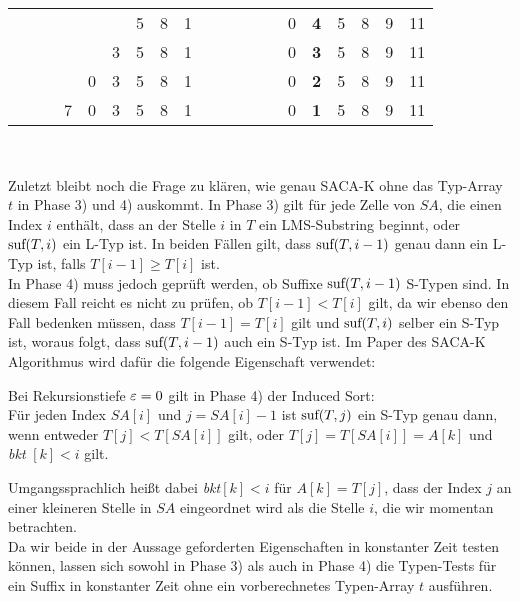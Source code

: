\begin{center}
\begin{tabular}{| r || c | c c c c c | c c | c | c | c c |   c   |c c c c c c| }
	\cline{1-13}
    \cline{15-20}
& & & & & & 5 & 8 & 1 & & & &         & & 0 & \textbf 4 & 5 & 8 & 9 & 11 \\
	\cline{1-13}
    \cline{15-20}
& & & & & 3 & 5 & 8 & 1 & & & &          & & 0 & \textbf 3 & 5 & 8 & 9 & 11 \\
	\cline{1-13}
    \cline{15-20}
& & & & 0 & 3 & 5 & 8 & 1 & & & &         & & 0 & \textbf 2 & 5 & 8 & 9 & 11 \\
	\cline{1-13}
    \cline{15-20}
& & & 7 & 0 & 3 & 5 & 8 & 1 & & & &        & & 0 & \textbf 1 & 5 & 8 & 9 & 11 \\
	\cline{1-13}
    \cline{15-20}
\end{tabular} \\
\end{center}

Zuletzt bleibt noch die Frage zu klären, wie genau SACA-K ohne das Typ-Array $t$ in Phase 3) und 4) auskommt. In Phase 3) gilt für jede Zelle von $SA$, die einen Index $i$ enthält, dass an der Stelle $i$ in $T$ ein LMS-Substring beginnt, oder $\text{suf}(T,i)$ ein L-Typ ist. In beiden Fällen gilt, dass $\text{suf}(T,i-1)$ genau dann ein L-Typ ist, falls $T[i-1] \geq T[i]$ ist. \\
In Phase 4) muss jedoch geprüft werden, ob Suffixe $\text{suf}(T,i-1)$ S-Typen sind. In diesem Fall reicht es nicht zu prüfen, ob $T[i-1] < T[i]$ gilt, da wir ebenso den Fall bedenken müssen, dass $T[i-1] = T[i]$ gilt und $\text{suf}(T,i)$ selber ein S-Typ ist, woraus folgt, dass $\text{suf}(T,i-1)$ auch ein S-Typ ist. Im Paper des SACA-K Algorithmus \cite{Nong} wird dafür die folgende Eigenschaft verwendet:

\begin{theorem}
Bei Rekursionstiefe $\varepsilon = 0$ gilt in Phase 4) der Induced Sort:  \\
Für jeden Index $SA[i]$ und $j = SA[i] - 1$ ist $\text{suf}(T,j)$ ein S-Typ genau dann, wenn entweder $T[j] < T[SA[i]]$ gilt, oder $T[j] = T[SA[i]] = A[k]$ und \textit{bkt} $[k] < i$ gilt.
\end{theorem}

Umgangssprachlich heißt dabei \textit{bkt}$[k] < i$ für $A[k] = T[j]$, dass der Index $j$ an einer kleineren Stelle in $SA$ eingeordnet wird als die Stelle $i$, die wir momentan betrachten. \\
Da wir beide in der Aussage geforderten Eigenschaften in konstanter Zeit testen können, lassen sich sowohl in Phase 3) als auch in Phase 4) die Typen-Tests für ein Suffix in konstanter Zeit ohne ein vorberechnetes Typen-Array $t$ ausführen.

